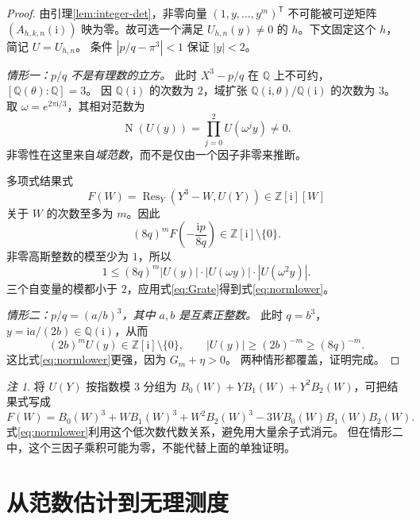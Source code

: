 \documentclass[UTF8,fontset=fandol,a4paper,11pt]{ctexart}
\theoremstyle{remark}
\newtheorem{remark}[theorem]{注}
\newcommand{\Q}{\mathbb Q}
\newcommand{\Z}{\mathbb Z}
\newcommand{\ii}{\mathrm i}
\newcommand{\Norm}{\operatorname{N}}
\newcommand{\Res}{\operatorname{Res}}
\numberwithin{equation}{section}
\begin{document}
\begin{proof}
由引理\ref{lem:integer-det}，非零向量 $(1,y,\ldots,y^m)^\mathsf{T}$
不可能被可逆矩阵 $(A_{h,k,n}(\ii))$ 映为零。故可选一个满足
$U_{h,n}(y)\ne0$ 的 $h$。下文固定这个 $h$，简记 $U=U_{h,n}$。
条件 $|p/q-\pi^3|<1$ 保证 $|y|<2$。

\emph{情形一：$p/q$ 不是有理数的立方。}
此时 $X^3-p/q$ 在 $\Q$ 上不可约，$[\Q(\theta):\Q]=3$。
因 $\Q(\ii)$ 的次数为 $2$，域扩张 $\Q(\ii,\theta)/\Q(\ii)$ 的次数为 $3$。
取 $\omega=e^{2\pi\ii/3}$，其相对范数为
\begin{equation}\label{eq:normproduct}
\Norm(U(y))=\prod_{j=0}^{2}U(\omega^j y)\ne0.
\end{equation}
非零性在这里来自\emph{域范数}，而不是仅由一个因子非零来推断。

多项式结果式
\[
F(W)=\Res_Y(Y^3-W,U(Y))\in\Z[\ii][W]
\]
关于 $W$ 的次数至多为 $m$。因此
\[
(8q)^m F\left(-\frac{\ii p}{8q}\right)
\in\Z[\ii]\setminus\{0\}.
\]
非零高斯整数的模至少为 $1$，所以
\[
1\le(8q)^m |U(y)|\cdot|U(\omega y)|\cdot|U(\omega^2y)|.
\]
三个自变量的模都小于 $2$，应用式\eqref{eq:Grate}得到式\eqref{eq:normlower}。

\emph{情形二：$p/q=(a/b)^3$，其中 $a,b$ 是互素正整数。}
此时 $q=b^3$，$y=\ii a/(2b)\in\Q(\ii)$，从而
\[
(2b)^m U(y)\in\Z[\ii]\setminus\{0\},\qquad
|U(y)|\ge(2b)^{-m}\ge(8q)^{-m}.
\]
这比式\eqref{eq:normlower}更强，因为 $G_m+\eta>0$。
两种情形都覆盖，证明完成。
\end{proof}

\begin{remark}
将 $U(Y)$ 按指数模 $3$ 分组为
$B_0(W)+YB_1(W)+Y^2B_2(W)$，可把结果式写成
\[
F(W)=B_0(W)^3+WB_1(W)^3+W^2B_2(W)^3
      -3WB_0(W)B_1(W)B_2(W).
\]
式\eqref{eq:normlower}利用这个低次数代数关系，避免用大量余子式消元。
但在情形二中，这个三因子乘积可能为零，不能代替上面的单独证明。
\end{remark}

\section{从范数估计到无理测度}
\end{document}
